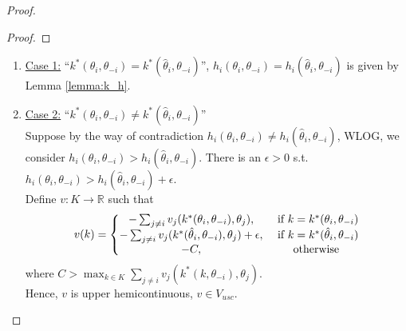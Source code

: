 \documentclass[11pt]{elegantbook_2}
\begin{document}
\begin{proof}
\begin{proof}
    \end{proof}
    \begin{enumerate}
        \item \underline{Case 1:} ``$k^*(\theta_i,\theta_{-i})=k^*(\hat{\theta}_i,\theta_{-i})$'', $h_i(\theta_i,\theta_{-i})=h_i(\hat{\theta}_i,\theta_{-i})$ is given by Lemma \ref{lemma:k_h}.
        \item \underline{Case 2:} ``$k^*(\theta_i,\theta_{-i})\neq k^*(\hat{\theta}_i,\theta_{-i})$''\\
        Suppose by the way of contradiction $h_i(\theta_i,\theta_{-i})\neq h_i(\hat{\theta}_i,\theta_{-i})$, WLOG, we consider $h_i(\theta_i,\theta_{-i})>h_i(\hat{\theta}_i,\theta_{-i})$. There is an $\epsilon>0$ s.t. $h_i(\theta_i,\theta_{-i})>h_i(\hat{\theta}_i,\theta_{-i})+\epsilon$.\\
        Define $v: K \rightarrow \mathbb{R}$ such that
        \begin{equation}
            \begin{aligned}
                v(k)=\left\{\begin{matrix}
                    -\sum_{j\neq i}v_j(k^*(\theta_i,\theta_{-i}),\theta_j),& \textnormal{ if }k=k^*(\theta_i,\theta_{-i})\\
                    -\sum_{j\neq i}v_j(k^*(\hat{\theta}_i,\theta_{-i}),\theta_j)+\epsilon,& \textnormal{ if }k=k^*(\hat{\theta}_i,\theta_{-i})\\
                    -C,&\textnormal{ otherwise}\
                \end{matrix}\right.
            \end{aligned}
            \nonumber
        \end{equation}
        where $C>\max_{k\in K}\sum_{j\neq i}v_j(k^*(k,\theta_{-i}),\theta_j)$.\\
        Hence, $v$ is upper hemicontinuous, $v\in V_{usc}$.


\end{enumerate}
\end{proof}
\end{document}
